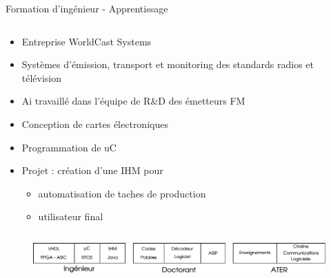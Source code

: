 \documentclass[t,compress,mathserif,12pt,xcolor=dvipsnames]{beamer}
\begin{document}
\begin{frame}[t]{Formation d'ingénieur - Apprentissage}
  \begin{minipage}[t][5.0cm][t]{\textwidth}
    \begin{columns}
      \begin{column}{0.63\textwidth}
        \vspace{-30pt}
        \begin{itemize}
        \item Entreprise WorldCast Systems
        \item Systèmes d'émission, transport et monitoring des standards radios et télévision
        \item Ai travaillé dans l'équipe de R\&D des émetteurs FM
        \item Conception de cartes électroniques
        \item Programmation de uC 
        \item Projet : création d'une IHM pour
          \begin{itemize}
            \item automatisation de taches de production
            \item utilisateur final
          \end{itemize}
        \end{itemize}
      \end{column}
      \begin{column}{0.04\textwidth}

      \end{column}
      \begin{column}{0.33\textwidth}
      \end{column}
    \end{columns}
  \end{minipage}
  \begin{figure}[htp]
    \centering
    \includegraphics[width=\textwidth]{fig/frise}
  \end{figure}


\end{frame}
\end{document}
